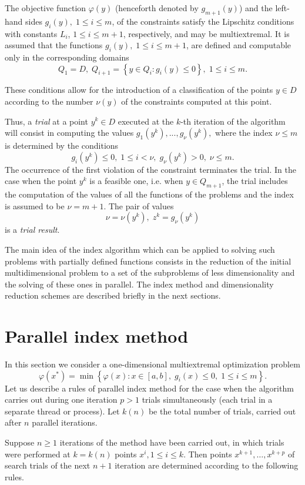 \documentclass[a4paper]{jpconf}
\begin{document}
The objective function $\varphi(y)$ (henceforth denoted by $g_{m+1}(y)$) and
the left-hand sides $g_i(y), \; 1\leq i \leq m$, of the constraints
satisfy the Lipschitz conditions with constants $L_i$, $1 \leq i \leq
m+1$, respectively, and may be multiextremal. It is assumed that the
functions $g_i(y),\; 1 \leq i \leq m+1$, are defined and computable only in 
the corresponding domains
\[
Q_1=D, \; Q_{i+1}=\left\{y \in Q_i : g_i(y) \leq 0 \right\}, \; 1 \leq i \leq 
m.
\]

These conditions allow for the introduction of a classification of the
points $y \in D$ according to the number $\nu (y)$ of the constraints
computed at this point. 

Thus, a \textit{trial} at a point $y^k \in D$ executed at the $k$-th
iteration of the algorithm will consist in computing the values 
$g_1(y^k),...,g_\nu(y^k),$ where the
index $\nu \leq m$ is determined by the conditions
\[
	g_i(y^k )\leq 0, \; 1 \leq i < \nu, \; g_\nu(y^k)>0, \; \nu \leq m.
\]
The occurrence of the first violation of the constraint terminates the
trial. In the case when the point $y^k$ is a feasible one, i.e. when
$y \in Q_{m+1}$, the trial includes the computation of the values of
all the functions of the problems and the index is assumed to be
$\nu=m+1$. The pair of values
\[
\nu=\nu(y^k), \; z^k=g_\nu(y^k)
\]
is a \textit{trial result}.

The main idea of the index algorithm which can be applied to solving such problems 
with partially defined functions consists in the reduction of the initial multidimensional problem to a set of 
the subproblems of less dimensionality and the solving of these ones 
in parallel. The index method and dimensionality reduction schemes are described briefly in the next sections.


\section{Parallel index method}

In this section we consider a one-dimensional multiextremal optimization problem
\[
\varphi(x^\ast)=\min{\left\{\varphi(x): x \in [a,b], \; g_i(x)\leq 0, \; 1 \leq i \leq m\right\}}.
\]
Let us describe a rules of parallel index method for the case when the algorithm carries out during one iteration $p>1$ trials simultaneously (each trial in a separate thread or process). Let $k(n)$ be the total number of trials, carried out after $n$ parallel iterations.

Suppose $n\geq 1$  iterations of the method have been carried out, in which trials were performed at $k=k(n)$ points $x^i,1\leq i \leq k$. Then points $x^{k+1},\dots,x^{k+p}$  of search trials of the next $n+1$ iteration are determined according to the following rules.
\end{document}
